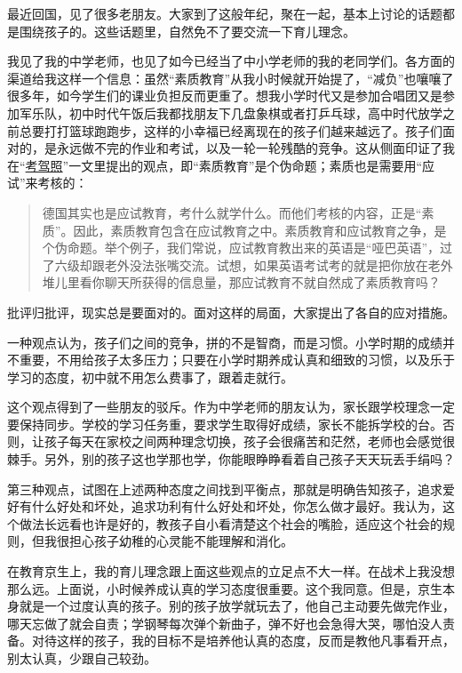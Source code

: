 \documentclass[twoside,openright,headings=optiontohead]{ctexbook} %
\begin{document}
{最近回国，见了很多老朋友。大家到了这般年纪，聚在一起，基本上讨论的话题都是围绕孩子的。这些话题里，自然免不了要交流一下育儿理念。

我见了我的中学老师，也见了如今已经当了中小学老师的我的老同学们。各方面的渠道给我这样一个信息：虽然``素质教育''从我小时候就开始提了，``减负''也嚷嚷了很多年，如今学生们的课业负担反而更重了。想我小学时代又是参加合唱团又是参加军乐队，初中时代午饭后我都找朋友下几盘象棋或者打乒乓球，高中时代放学之前总要打打篮球跑跑步，这样的小幸福已经离现在的孩子们越来越远了。孩子们面对的，是永远做不完的作业和考试，以及一轮一轮残酷的竞争。这从侧面印证了我在``\href{http://dapengde.com/archives/15557}{考驾照}''一文里提出的观点，即``素质教育''是个伪命题；素质也是需要用``应试''来考核的：

\begin{quote}
德国其实也是应试教育，考什么就学什么。而他们考核的内容，正是``素质''。因此，素质教育包含在应试教育之中。素质教育和应试教育之争，是个伪命题。举个例子，我们常说，应试教育教出来的英语是``哑巴英语''，过了六级却跟老外没法张嘴交流。试想，如果英语考试考的就是把你放在老外堆儿里看你聊天所获得的信息量，那应试教育不就自然成了素质教育吗？
\end{quote}

批评归批评，现实总是要面对的。面对这样的局面，大家提出了各自的应对措施。

一种观点认为，孩子们之间的竞争，拼的不是智商，而是习惯。小学时期的成绩并不重要，不用给孩子太多压力；只要在小学时期养成认真和细致的习惯，以及乐于学习的态度，初中就不用怎么费事了，跟着走就行。

这个观点得到了一些朋友的驳斥。作为中学老师的朋友认为，家长跟学校理念一定要保持同步。学校的学习任务重，要求学生取得好成绩，家长不能拆学校的台。否则，让孩子每天在家校之间两种理念切换，孩子会很痛苦和茫然，老师也会感觉很棘手。另外，别的孩子这也学那也学，你能眼睁睁看着自己孩子天天玩丢手绢吗？

第三种观点，试图在上述两种态度之间找到平衡点，那就是明确告知孩子，追求爱好有什么好处和坏处，追求功利有什么好处和坏处，你怎么做才最好。我认为，这个做法长远看也许是好的，教孩子自小看清楚这个社会的嘴脸，适应这个社会的规则，但我很担心孩子幼稚的心灵能不能理解和消化。

在教育京生上，我的育儿理念跟上面这些观点的立足点不大一样。在战术上我没想那么远。上面说，小时候养成认真的学习态度很重要。这个我同意。但是，京生本身就是一个过度认真的孩子。别的孩子放学就玩去了，他自己主动要先做完作业，哪天忘做了就会自责；学钢琴每次弹个新曲子，弹不好也会急得大哭，哪怕没人责备。对待这样的孩子，我的目标不是培养他认真的态度，反而是教他凡事看开点，别太认真，少跟自己较劲。

}
\end{document}
